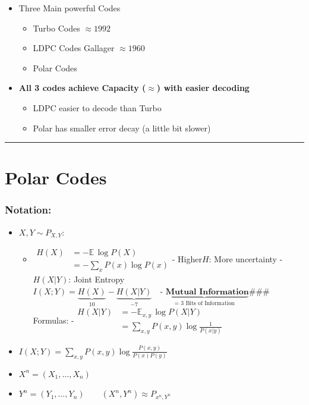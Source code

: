 \documentclass[11pt]{article}
\providecommand{\tightlist}{%
      \setlength{\itemsep}{0pt}\setlength{\parskip}{0pt}}
\begin{document}
    \begin{itemize}
\tightlist
\item
  Three Main powerful Codes

  \begin{itemize}
  \tightlist
  \item
    Turbo Codes \(\approx 1992\)
  \item
    LDPC Codes Gallager \(\approx 1960\)
  \item
    Polar Codes
  \end{itemize}
\item
  \textbf{All 3 codes achieve Capacity (\(\approx\)) with easier
  decoding}

  \begin{itemize}
  \tightlist
  \item
    LDPC easier to decode than Turbo
  \item
    Polar has smaller error decay (a little bit slower)
  \end{itemize}
\end{itemize}

\begin{center}\rule{0.5\linewidth}{0.5pt}\end{center}

    \section{\texorpdfstring{\textbf{Polar
Codes}}{Polar Codes}}\label{polar-codes}

\subsubsection{Notation:}\label{notation}

\begin{itemize}
\item
  \(X, Y \sim P_{X, Y}\):

  \begin{itemize}
  \tightlist
  \item
    \(\begin{align}
      H(X) &= -\mathbb{E} \, \log P(X) \\
           &= -\sum_x P(x) \log P(x)
           \end{align}\)- Higher\(H\): More uncertainty -\(H(X | Y)\):
    Joint
    Entropy\(I(X; Y) = \underbrace{H(X)}_{10} - \underbrace{H(X | Y)}_{ - 7} \quad \underbrace{\textbf{- Mutual Information}}_\text{= 3 Bits of Information}\)\#\#\#
    Formulas:
    -\(\begin{align} H(X | Y) &= -\mathbb{E}_{x,y} \, \log P(X | Y) \\ &= \sum_{x, y} P(x, y) \log \frac{1}{P(x | y)} \end{align}\)
  \end{itemize}
\item
  \(I(X; Y) = \sum\limits_{x, y} P(x, y) \log \frac{P(x, y)}{P(x) P(y)}\)
\item
  \(X^n = (X_1, \dots, X_n)\)
\item
  \(Y^n = (Y_1, \dots, Y_n)\)\(\qquad (X^n,Y^n) \approx P_{x^n,Y^n}\)
\end{itemize}
\end{document}
